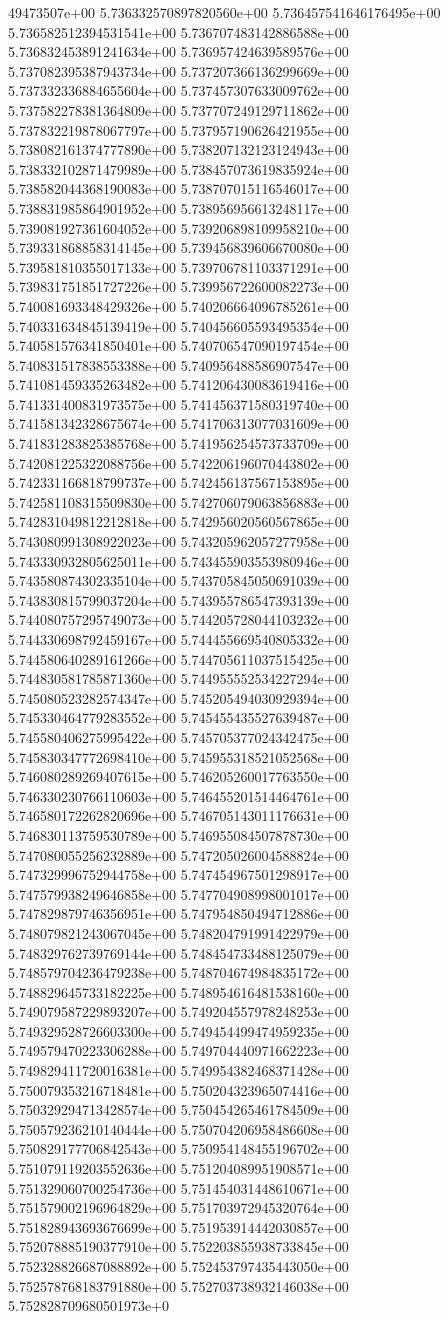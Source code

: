 49473507e+00	5.736332570897820560e+00	5.736457541646176495e+00	5.736582512394531541e+00	5.736707483142886588e+00	5.736832453891241634e+00	5.736957424639589576e+00	5.737082395387943734e+00	5.737207366136299669e+00	5.737332336884655604e+00	5.737457307633009762e+00	5.737582278381364809e+00	5.737707249129711862e+00	5.737832219878067797e+00	5.737957190626421955e+00	5.738082161374777890e+00	5.738207132123124943e+00	5.738332102871479989e+00	5.738457073619835924e+00	5.738582044368190083e+00	5.738707015116546017e+00	5.738831985864901952e+00	5.738956956613248117e+00	5.739081927361604052e+00	5.739206898109958210e+00	5.739331868858314145e+00	5.739456839606670080e+00	5.739581810355017133e+00	5.739706781103371291e+00	5.739831751851727226e+00	5.739956722600082273e+00	5.740081693348429326e+00	5.740206664096785261e+00	5.740331634845139419e+00	5.740456605593495354e+00	5.740581576341850401e+00	5.740706547090197454e+00	5.740831517838553388e+00	5.740956488586907547e+00	5.741081459335263482e+00	5.741206430083619416e+00	5.741331400831973575e+00	5.741456371580319740e+00	5.741581342328675674e+00	5.741706313077031609e+00	5.741831283825385768e+00	5.741956254573733709e+00	5.742081225322088756e+00	5.742206196070443802e+00	5.742331166818799737e+00	5.742456137567153895e+00	5.742581108315509830e+00	5.742706079063856883e+00	5.742831049812212818e+00	5.742956020560567865e+00	5.743080991308922023e+00	5.743205962057277958e+00	5.743330932805625011e+00	5.743455903553980946e+00	5.743580874302335104e+00	5.743705845050691039e+00	5.743830815799037204e+00	5.743955786547393139e+00	5.744080757295749073e+00	5.744205728044103232e+00	5.744330698792459167e+00	5.744455669540805332e+00	5.744580640289161266e+00	5.744705611037515425e+00	5.744830581785871360e+00	5.744955552534227294e+00	5.745080523282574347e+00	5.745205494030929394e+00	5.745330464779283552e+00	5.745455435527639487e+00	5.745580406275995422e+00	5.745705377024342475e+00	5.745830347772698410e+00	5.745955318521052568e+00	5.746080289269407615e+00	5.746205260017763550e+00	5.746330230766110603e+00	5.746455201514464761e+00	5.746580172262820696e+00	5.746705143011176631e+00	5.746830113759530789e+00	5.746955084507878730e+00	5.747080055256232889e+00	5.747205026004588824e+00	5.747329996752944758e+00	5.747454967501298917e+00	5.747579938249646858e+00	5.747704908998001017e+00	5.747829879746356951e+00	5.747954850494712886e+00	5.748079821243067045e+00	5.748204791991422979e+00	5.748329762739769144e+00	5.748454733488125079e+00	5.748579704236479238e+00	5.748704674984835172e+00	5.748829645733182225e+00	5.748954616481538160e+00	5.749079587229893207e+00	5.749204557978248253e+00	5.749329528726603300e+00	5.749454499474959235e+00	5.749579470223306288e+00	5.749704440971662223e+00	5.749829411720016381e+00	5.749954382468371428e+00	5.750079353216718481e+00	5.750204323965074416e+00	5.750329294713428574e+00	5.750454265461784509e+00	5.750579236210140444e+00	5.750704206958486608e+00	5.750829177706842543e+00	5.750954148455196702e+00	5.751079119203552636e+00	5.751204089951908571e+00	5.751329060700254736e+00	5.751454031448610671e+00	5.751579002196964829e+00	5.751703972945320764e+00	5.751828943693676699e+00	5.751953914442030857e+00	5.752078885190377910e+00	5.752203855938733845e+00	5.752328826687088892e+00	5.752453797435443050e+00	5.752578768183791880e+00	5.752703738932146038e+00	5.752828709680501973e+0